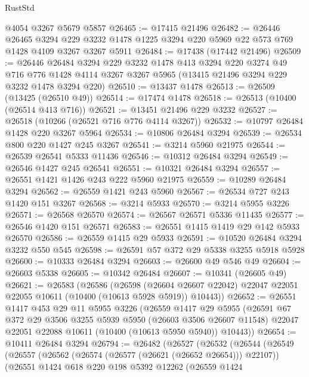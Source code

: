 \begin{lexlean}{RustStd}
\begin{coremodule}
{\begin{coremodule}
{{{{{{{{{{{{{{{{{{{{{{{{{    @4054
    @3267
    @5679
    @5857
@26465 := @17415 @21496
@26482 := @26446
    @26465
    @3294
    @229
    @3232
    @1478
    @1225
    @3294
    @220
    @5969
    @22
    @573
    @769
    @1428
    @4109
    @3267
    @3267
    @5911
@26484 := @17438 (@17442 @21496)
@26509 := @26446
    @26484
    @3294
    @229
    @3232
    @1478
    @413
    @3294
    @220
    @3274
    @49
    @716
    @776
    @1428
    @4114
    @3267
    @3267
    @5965
    (@13415 @21496 @3294 @229 @3232 @1478 @3294 @220)
@26510 := @13437 @1478
@26513 := @26509 (@13425 (@26510 @49))
@26514 := @17474 @1478
@26518 := @26513 (@10400 (@26514 @413 @716))
@26521 := @13451 @21496 @229 @3232
@26527 := @26518 (@10266 (@26521 @716 @776 @4114 @3267))
@26532 := @10797 @26484 @1428 @220 @3267 @5964
@26534 := @10806 @26484 @3294
@26539 := @26534 @800 @220 @1427 @245 @3267
@26541 := @3214 @5960 @21975
@26544 := @26539 @26541 @5333 @11436
@26546 := @10312 @26484 @3294
@26549 := @26546 @1427 @245 @26541
@26551 := @10321 @26484 @3294
@26557 := @26551 @1421 @1426 @243 @222 @5960 @21975
@26559 := @10289 @26484 @3294
@26562 := @26559 @1421 @243 @5960
@26567 := @26534 @727 @243 @1420 @151 @3267
@26568 := @3214 @5933
@26570 := @3214 @5955 @3226
@26571 := @26568 @26570
@26574 := @26567 @26571 @5336 @11435
@26577 := @26546 @1420 @151 @26571
@26583 := @26551 @1415 @1419 @29 @142 @5933 @26570
@26586 := @26559 @1415 @29 @5933
@26591 := @10520 @26484 @3294 @3232 @550 @545
@26598 := @26591 @57 @372 @29 @5338 @3255 @5918 @5928
@26600 := @10333 @26484 @3294
@26603 := @26600 @49 @546 @49
@26604 := @26603 @5338
@26605 := @10342 @26484
@26607 := @10341 (@26605 @49)
@26621 := @26583
    (@26586
      (@26598
        (@26604 @26607 @22042)
        @22047
        @22051
        @22055
        @10611
        (@10400 (@10613 @5928 @5919))
        @10443))
@26652 := @26551
    @1417
    @453
    @29
    @11
    @5955
    @3226
    (@26559
      @1417
      @29
      @5955
      (@26591
        @67
        @372
        @29
        @3506
        @3255
        @5939
        @5950
        (@26603 @3506 @26607 @11548)
        @22047
        @22051
        @22088
        @10611
        (@10400 (@10613 @5950 @5940))
        @10443))
@26654 := @10411 @26484 @3294
@26794 := @26482
    (@26527
      (@26532
        (@26544
          (@26549
            (@26557
              (@26562 (@26574 (@26577 (@26621 (@26652 @26654))) @22107))
              (@26551
                @1424
                @618
                @220
                @198
                @5392
                @12262
                (@26559
                  @1424
}}}}}}}}}}}}}}}}}}}}}}}}}
\end{coremodule}}
\end{coremodule}
\end{lexlean}

